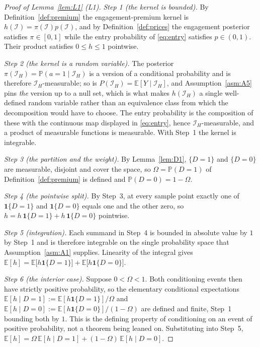 \documentclass[11pt]{article}
\newcommand{\Eop}{\mathbb{E}}
\newcommand{\Prb}{\mathbb{P}}
\newcommand{\ind}{\mathbf{1}}
\begin{document}
\begin{proof}[Proof of Lemma~\ref{lem:L1} (L1)]
\emph{Step 1 (the kernel is bounded).} By Definition~\ref{def:premium} the engagement-premium kernel
is $h(\mathcal I) = \pi(\mathcal I)p(\mathcal I)$, and by Definition~\ref{def:prices} the engagement
posterior satisfies $\pi \in [0,1]$ while the entry probability of \eqref{eq:entry} satisfies
$p \in (0,1)$. Their product satisfies $0 \le h \le 1$ pointwise.

\emph{Step 2 (the kernel is a random variable).} The posterior
$\pi(\mathcal I_H) = \Prb(a=1 \mid \mathcal I_H)$ is a version of a conditional probability and is
therefore $\mathcal I_H$-measurable; so is $P(\mathcal I_H) = \Eop[Y \mid \mathcal I_H]$, and
Assumption~\ref{asm:A5} pins \emph{the} version up to a null set, which is what makes $h(\mathcal
I_H)$ a single well-defined random variable rather than an equivalence class from which the
decomposition would have to choose. The entry probability is the composition of these with the
continuous map displayed in \eqref{eq:entry}, hence $\mathcal I_H$-measurable, and a product of
measurable functions is measurable. With Step~1 the kernel is integrable.

\emph{Step 3 (the partition and the weight).} By Lemma~\ref{lem:D1}, $\{D=1\}$ and $\{D=0\}$ are
measurable, disjoint and cover the space, so $\Omega = \Prb(D=1)$ of Definition~\ref{def:premium} is
defined and $\Prb(D=0) = 1-\Omega$.

\emph{Step 4 (the pointwise split).} By Step~3, at every sample point exactly one of
$\ind\{D=1\}$ and $\ind\{D=0\}$ equals one and the other zero, so
$h = h\,\ind\{D=1\} + h\,\ind\{D=0\}$ pointwise.

\emph{Step 5 (integration).} Each summand in Step~4 is bounded in absolute value by $1$ by Step~1 and
is therefore integrable on the single probability space that Assumption~\ref{asm:A1} supplies.
Linearity of the integral gives
$\Eop[h] = \Eop\bigl[h\ind\{D=1\}\bigr] + \Eop\bigl[h\ind\{D=0\}\bigr]$.

\emph{Step 6 (the interior case).} Suppose $0 < \Omega < 1$. Both conditioning events then have
strictly positive probability, so the elementary conditional expectations
$\Eop[h \mid D=1] := \Eop[h\ind\{D=1\}]/\Omega$ and
$\Eop[h \mid D=0] := \Eop[h\ind\{D=0\}]/(1-\Omega)$ are defined and finite, Step~1 bounding both by
$1$. This is the defining property of conditioning on an event of positive probability, not a theorem
being leaned on. Substituting into Step~5,
$\Eop[h] = \Omega\,\Eop[h \mid D=1] + (1-\Omega)\,\Eop[h \mid D=0]$.


\end{proof}
\end{document}
